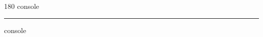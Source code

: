 
\begin{frame}
\begin{center}
\begin{turn}{180}
{\fontsize{2.5cm}{1em}\selectfont console}
\end{turn}
\vspace{1em}\par  
\hrule
\vspace{1em}\par  
{\fontsize{2.5cm}{1em}\selectfont console}
\end{center}
\end{frame}
